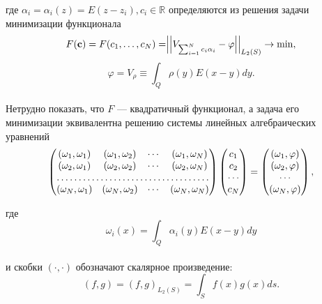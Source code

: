 \documentclass[a4paper]{article}
\newcommand{\V}[1]{\int_Q #1(y) E(x-y) dy}
\begin{document}
где $\alpha_i=\alpha_i(z)=E(z-z_i),c_i \in \mathbb{R}$ определяются из решения задачи минимизации функционала
\begin{equation}
  F({\bf c})=F(c_1,\dots,c_N)=\Bigr|\Bigr|V_{\sum_{i=1}^N c_i \alpha_i} -\varphi\Bigr|\Bigr|_{L_2(S)} \rightarrow \min,
\end{equation}
\begin{equation*}
  \varphi =V_{\rho} \equiv \V{\rho}.
\end{equation*}
\\
Нетрудно показать, что $F$ --- квадратичный функционал, а задача его минимизации эквивалентна решению системы линейных алгебраических уравнений
\begin{equation}
  \begin{pmatrix}
    (\omega_1, \omega_1) & (\omega_1, \omega_2) & \cdots & (\omega_1, \omega_N) \\
    (\omega_2, \omega_1) & (\omega_2, \omega_2) & \cdots & (\omega_2, \omega_N) \\
    \hdotsfor{4}                                                                \\
    (\omega_N, \omega_1) & (\omega_N, \omega_2) & \cdots & (\omega_N, \omega_N) \\
  \end{pmatrix}
  \begin{pmatrix}
    c_1    \\
    c_2    \\
    \cdots \\
    c_N    \\
  \end{pmatrix}
  =
  \begin{pmatrix}
    (\omega_1,\varphi) \\
    (\omega_2,\varphi) \\
    \cdots             \\
    (\omega_N,\varphi) \\
  \end{pmatrix},
  \label{gram}
\end{equation}

где
\\
\begin{equation}
  \omega_i(x)=\V{\alpha_i}
\end{equation}
\\
и скобки $(\cdot,\cdot)$ обозначают скалярное произведение:
\begin{equation}
  (f,g)=(f,g)_{L_2(S)}=\int_S f(x)g(x) ds.
\end{equation}
\end{document}
